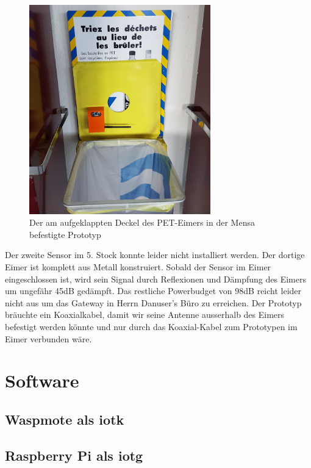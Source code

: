 \begin{figure}[H]
     \centering
        \includegraphics[width=0.7\textwidth]{pictures/Tresh-Deployed.jpg}
    \caption{Der am aufgeklappten Deckel des PET-Eimers in der Mensa befestigte Prototyp}
    \label{fig:3-Prototypes}
\end{figure}

Der zweite Sensor im 5. Stock konnte leider nicht installiert werden. Der dortige Eimer ist komplett aus Metall konstruiert. Sobald der Sensor im Eimer eingeschlossen ist, wird sein Signal durch Reflexionen und Dämpfung des Eimers um ungefähr 45dB gedämpft. Das restliche Powerbudget von 98dB reicht leider nicht aus um das Gateway in Herrn Danuser's Büro zu erreichen. Der Prototyp bräuchte ein Koaxialkabel, damit wir seine Antenne ausserhalb des Eimers befestigt werden könnte und nur durch das Koaxial-Kabel zum Prototypen im Eimer verbunden wäre.


\section{Software}

\subsection{Waspmote als \gls{iotk}}


\subsection{Raspberry Pi als \gls{iotg}}

